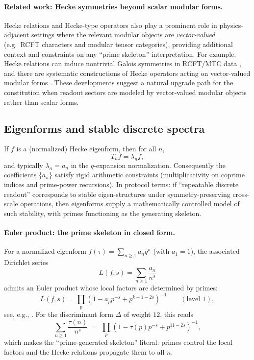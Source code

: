 \paragraph{Related work: Hecke symmetries beyond scalar modular forms.}
Hecke relations and Hecke-type operators also play a prominent role in physics-adjacent settings where the relevant modular objects are \emph{vector-valued} (e.g.\ RCFT characters and modular tensor categories), providing additional context and constraints on any ``prime skeleton'' interpretation. For example, Hecke relations can induce nontrivial Galois symmetries in RCFT/MTC data \cite{HarveyHuWu2019GaloisSymmetryHeckeRCFT}, and there are systematic constructions of Hecke operators acting on vector-valued modular forms \cite{BouchardCreutzigJoshi2019VectorValuedHecke}. These developments suggest a natural upgrade path for the constitution when readout sectors are modeled by vector-valued modular objects rather than scalar forms.

\subsection{Eigenforms and stable discrete spectra}
\label{sec:eigenforms}

If $f$ is a (normalized) Hecke eigenform, then for all $n$,
\begin{equation}
T_n f = \lambda_n f,
\end{equation}
and typically $\lambda_n=a_n$ in the $q$-expansion normalization. Consequently the coefficients $\{a_n\}$ satisfy rigid arithmetic constraints (multiplicativity on coprime indices and prime-power recursions). In protocol terms: if ``repeatable discrete readout'' corresponds to stable eigen-structures under symmetry-preserving cross-scale operations, then eigenforms supply a mathematically controlled model of such stability, with primes functioning as the generating skeleton.

\paragraph{Euler product: the prime skeleton in closed form.}
For a normalized eigenform $f(\tau)=\sum_{n\ge 1} a_n q^n$ (with $a_1=1$), the associated Dirichlet series
\begin{equation}
L(f,s)=\sum_{n\ge 1}\frac{a_n}{n^s}
\end{equation}
admits an Euler product whose local factors are determined by primes:
\begin{equation}
L(f,s)=\prod_{p}\left(1-a_p p^{-s}+p^{k-1-2s}\right)^{-1}
\qquad (\text{level }1),
\end{equation}
see, e.g., \cite{Serre1973,Apostol1990,DiamondShurman2005}. For the discriminant form $\Delta$ of weight $12$, this reads
\begin{equation}
\sum_{n\ge 1}\frac{\tau(n)}{n^s}
\;=\;
\prod_{p}\left(1-\tau(p) p^{-s}+p^{11-2s}\right)^{-1},
\end{equation}
which makes the ``prime-generated skeleton'' literal: primes control the local factors and the Hecke relations propagate them to all $n$.

